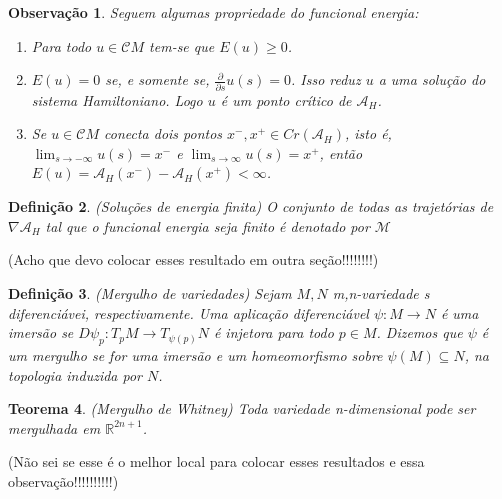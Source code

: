 \documentclass[12pt]{book}
\newtheorem{teorema}{Teorema}[section]
\newtheorem{definicao}[teorema]{Definição}
\newtheorem{observacao}[teorema]{Observação}
\newcommand{\derivadaparcial}[2]{\frac{\partial #1}{\partial #2}}
\newcommand{\energiafinitaM}{\mathcal{M}}
\newcommand{\funcionalH}{\mathcal{A}_{H}}
\newcommand{\gradientefuncional}{\nabla \funcionalH}
\newcommand{\pontoscriticos}[1]{\textit{Cr}(#1)}
\newcommand{\real}[1]{\mathbb{R}^{#1}}
\newcommand{\cilindrosLM}{\mathcal{C}M}
\newcommand{\alerta}[1]{{\color{red}#1}}
\begin{document}
	\begin{observacao}
		Seguem algumas propriedade do funcional energia:
		
		\begin{enumerate}
			\item Para todo $u \in \cilindrosLM$ tem-se que $E(u)\geq 0$.
			
			\item $E(u) = 0$ se, e somente se, $\derivadaparcial{}{s}u(s) = 0$. Isso reduz $u$ a uma solução do sistema Hamiltoniano. Logo $u$ é um ponto crítico de $\funcionalH$.
			
			\item Se $u \in \cilindrosLM$ conecta dois pontos $x^{-}, x^{+} \in \pontoscriticos{\funcionalH}$, isto é, $\lim_{s\to -\infty}u(s)=x^{-}$ e $\lim_{s\to \infty}u(s)=x^{+}$, então $E(u)=\funcionalH(x^{-}) - \funcionalH(x^{+})<\infty$.
		\end{enumerate}
		
	\end{observacao}
	
	\begin{definicao}
		(Soluções de energia finita) O conjunto de todas as trajetórias de $\gradientefuncional$ tal que o funcional energia seja finito é denotado por $\energiafinitaM$ 
	\end{definicao}

	\alerta{(Acho que devo colocar esses resultado em outra seção!!!!!!!!)
		\begin{definicao}\label{definicao_mergulho_variedades}
			(Mergulho de variedades) Sejam $M, N$ m,n-variedade s diferenciávei, respectivamente. Uma aplicação diferenciável $\psi:M\to N$ é uma imersão se $D\psi_{p}:T_{p}M\to T_{\psi(p)}N$ é injetora para todo $p \in M$. Dizemos que $\psi$ é um mergulho se for uma imersão e um homeomorfismo sobre $\psi(M) \subseteq N$, na topologia induzida por $N$. 
		\end{definicao}
		
		\begin{teorema}\label{teorema_whitney}
			(Mergulho de Whitney) Toda variedade n-dimensional pode ser mergulhada em $\real{2n+1}$.
		\end{teorema}
	}
	
	\alerta{(Não sei se esse é o melhor local para colocar esses resultados e essa observação!!!!!!!!!!)}
	
\end{document}
